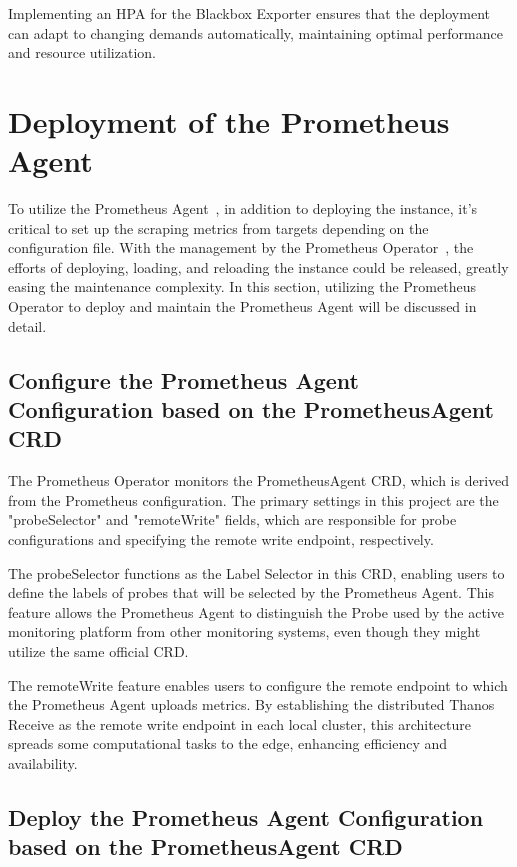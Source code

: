 Implementing an \ac{HPA} for the Blackbox Exporter ensures that the deployment can adapt to changing demands automatically, maintaining optimal performance and resource utilization.

\section{Deployment of the Prometheus Agent}

To utilize the Prometheus Agent~\parencite{PrometheusAgentSupport}, in addition to deploying the instance, it's critical to set up the scraping metrics from targets depending on the configuration file. With the management by the Prometheus Operator~\parencite{PrometheusOperator}, the efforts of deploying, loading, and reloading the instance could be released, greatly easing the maintenance complexity. In this section, utilizing the Prometheus Operator to deploy and maintain the Prometheus Agent will be discussed in detail. 

\subsection{Configure the Prometheus Agent Configuration based on the PrometheusAgent CRD}

The Prometheus Operator monitors the PrometheusAgent \ac{CRD}, which is derived from the Prometheus configuration. The primary settings in this project are the "probeSelector" and "remoteWrite" fields, which are responsible for probe configurations and specifying the remote write endpoint, respectively. 

The probeSelector functions as the Label Selector in this \ac{CRD}, enabling users to define the labels of probes that will be selected by the Prometheus Agent. This feature allows the Prometheus Agent to distinguish the Probe used by the active monitoring platform from other monitoring systems, even though they might utilize the same official \ac{CRD}. 

The remoteWrite feature enables users to configure the remote endpoint to which the Prometheus Agent uploads metrics. By establishing the distributed Thanos Receive as the remote write endpoint in each local cluster, this architecture spreads some computational tasks to the edge, enhancing efficiency and availability. 

\subsection{Deploy the Prometheus Agent Configuration based on the PrometheusAgent CRD}

